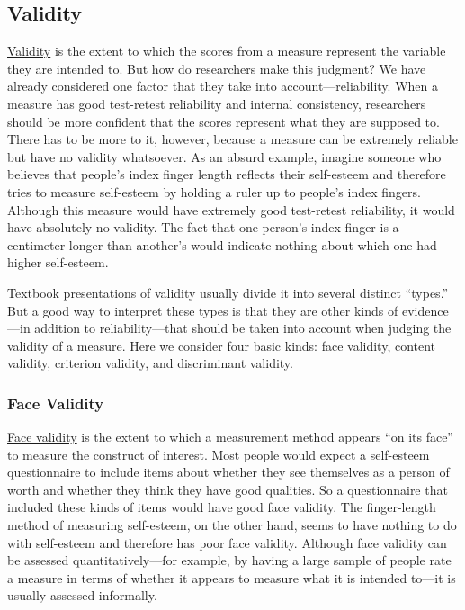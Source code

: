 \documentclass[
]{krantz}
\begin{document}
\subsection*{Validity}\label{validity}


\hyperref[validity]{Validity} is the extent to which the scores from a measure represent the variable they are intended to. But how do researchers make this judgment? We have already considered one factor that they take into account---reliability. When a measure has good test-retest reliability and internal consistency, researchers should be more confident that the scores represent what they are supposed to. There has to be more to it, however, because a measure can be extremely reliable but have no validity whatsoever. As an absurd example, imagine someone who believes that people's index finger length reflects their self-esteem and therefore tries to measure self-esteem by holding a ruler up to people's index fingers. Although this measure would have extremely good test-retest reliability, it would have absolutely no validity. The fact that one person's index finger is a centimeter longer than another's would indicate nothing about which one had higher self-esteem.

Textbook presentations of validity usually divide it into several distinct ``types.'' But a good way to interpret these types is that they are other kinds of evidence---in addition to reliability---that should be taken into account when judging the validity of a measure. Here we consider four basic kinds: face validity, content validity, criterion validity, and discriminant validity.

\subsubsection*{Face Validity}\label{face-validity}


\hyperref[face-validity]{Face validity} is the extent to which a measurement method appears ``on its face'' to measure the construct of interest. Most people would expect a self-esteem questionnaire to include items about whether they see themselves as a person of worth and whether they think they have good qualities. So a questionnaire that included these kinds of items would have good face validity. The finger-length method of measuring self-esteem, on the other hand, seems to have nothing to do with self-esteem and therefore has poor face validity. Although face validity can be assessed quantitatively---for example, by having a large sample of people rate a measure in terms of whether it appears to measure what it is intended to---it is usually assessed informally.
\end{document}
